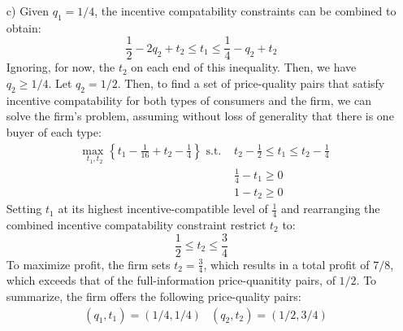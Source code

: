 \documentclass{article}
\newcommand{\usmax}[1]{\underset{#1}{\text{max }}}
\begin{document}
\begin{itemize}
	
	\item[c)] Given ${q_1=1/4}$, the incentive compatability constraints can be combined to obtain:
		\[
			\frac{1}{2} - 2q_2 + t_2\leq t_1 \leq \frac{1}{4} - q_2 + t_2
		\]
		Ignoring, for now, the $t_2$ on each end of this inequality. Then, we have ${q_2\geq1/4}$. Let ${q_2=1/2}$. Then, to find a set of price-quality pairs that satisfy incentive compatability for both types of consumers and the firm, we can solve the firm's problem, assuming without loss of generality that there is one buyer of each type:
		\begin{align*}
			&\usmax{t_1,t_2}\left\{t_1 - \frac{1}{16} + t_2 - \frac{1}{4}\right\}\text{ s.t. } 	& t_2 - \frac{1}{2}\leq t_1 \leq t_2 - \frac{1}{4}	\\
			&																					& \frac{1}{4} - t_1 \geq 0							\\
			&																					& 1 - t_2 			\geq 0
		\end{align*}
		Setting $t_1$ at its highest incentive-compatible level of $\frac{1}{4}$ and rearranging the combined incentive compatability constraint restrict $t_2$ to:
		\[
			\frac{1}{2}\leq t_2\leq \frac{3}{4}
		\]
		To maximize profit, the firm sets ${t_2=\frac{3}{4}}$, which results in a total profit of $7/8$, which exceeds that of the full-information price-quanitity pairs, of $1/2$. To summarize, the firm offers the following price-quality pairs:
		\begin{align*}
			&(q_1,t_1) = (1/4,1/4)	&(q_2,t_2) = (1/2,3/4)
		\end{align*}
		
\end{itemize}

\end{document}
